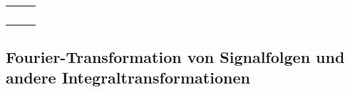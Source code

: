 \begin{table}[H]
{\begin{tabular}{| c | c | c |}
\parbox[c][0.5in][c]{0.3in}{} &
\parbox[c][0.5in][c]{2.7in}{\centering{$\sigma \left[k\right]$}} & 
\parbox[c][0.5in][c]{3.3in}{}\\ \hline

\parbox[c][0.5in][c]{0.3in}{} &
\parbox[c][0.5in][c]{2.7in}{} & 
\parbox[c][0.5in][c]{3.3in}{}\\ \hline

\parbox[c][0.7in][c]{0.3in}{} &
\parbox[c][0.7in][c]{2.7in}{} & 
\parbox[c][0.7in][c]{3.3in}{}\\ \hline

\parbox[c][0.7in][c]{0.3in}{} &
\parbox[c][0.7in][c]{2.7in}{} & 
\parbox[c][0.7in][c]{3.3in}{}\\ \hline

\parbox[c][0.5in][c]{0.3in}{} &
\parbox[c][0.5in][c]{2.7in}{} & 
\parbox[c][0.5in][c]{3.3in}{}\\ \hline

\parbox[c][0.5in][c]{0.3in}{} &
\parbox[c][0.5in][c]{2.7in}{} & 
\parbox[c][0.5in][c]{3.3in}{}\\ \hline

\end{tabular}%
}
\label{tab:sevenfive}
\end{table}

\clearpage

\subsection{Fourier-Transformation von Signalfolgen und andere Integraltransformationen}

